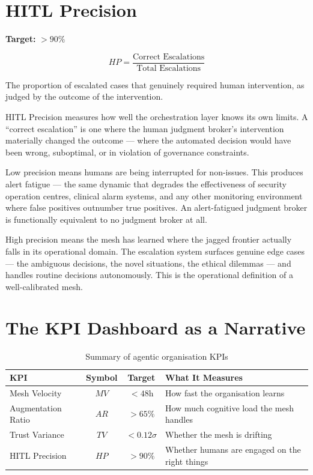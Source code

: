 \section{HITL Precision}

\begin{definitionbox}[title={Human-in-the-Loop Precision (HP)}]
\textbf{Target:} $> 90\%$

\[
HP = \frac{\text{Correct Escalations}}{\text{Total Escalations}}
\]

The proportion of escalated cases that genuinely required human intervention, as judged by the outcome of the intervention.
\end{definitionbox}

HITL Precision measures how well the orchestration layer knows its own limits. A ``correct escalation'' is one where the human judgment broker's intervention materially changed the outcome --- where the automated decision would have been wrong, suboptimal, or in violation of governance constraints.

Low precision means humans are being interrupted for non-issues. This produces alert fatigue --- the same dynamic that degrades the effectiveness of security operation centres, clinical alarm systems, and any other monitoring environment where false positives outnumber true positives. An alert-fatigued judgment broker is functionally equivalent to no judgment broker at all.

High precision means the mesh has learned where the jagged frontier actually falls in its operational domain. The escalation system surfaces genuine edge cases --- the ambiguous decisions, the novel situations, the ethical dilemmas --- and handles routine decisions autonomously. This is the operational definition of a well-calibrated mesh.

\section{The KPI Dashboard as a Narrative}

\begin{table}[h]
\centering
\caption{Summary of agentic organisation KPIs}
\label{tab:kpi-summary}
\begin{tabularx}{\textwidth}{l c c X}
\toprule
\textbf{KPI} & \textbf{Symbol} & \textbf{Target} & \textbf{What It Measures} \\
\midrule
Mesh Velocity & $MV$ & $< 48\text{h}$ & How fast the organisation learns \\
\addlinespace
Augmentation Ratio & $AR$ & $> 65\%$ & How much cognitive load the mesh handles \\
\addlinespace
Trust Variance & $TV$ & $< 0.12\sigma$ & Whether the mesh is drifting \\
\addlinespace
HITL Precision & $HP$ & $> 90\%$ & Whether humans are engaged on the right things \\
\bottomrule
\end{tabularx}
\end{table}


